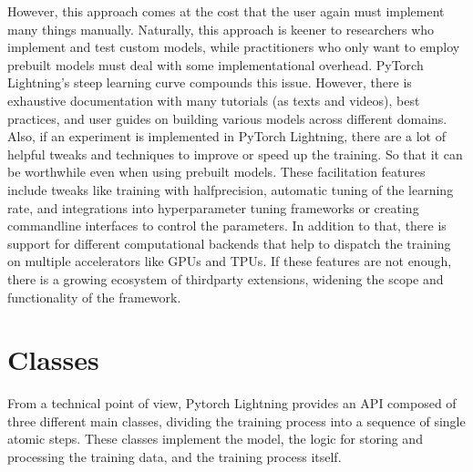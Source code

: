\documentclass[letterpaper,10pt,english]{jupyterBook}
\begin{document}
\sphinxAtStartPar
However, this approach comes at the cost that the user again must implement many things manually.
Naturally, this approach is keener to researchers who implement and test custom models, while practitioners who only want to employ pre\sphinxhyphen{}built models must deal with some implementational overhead.
PyTorch Lightning’s steep learning curve compounds this issue.
However, there is exhaustive documentation with many tutorials (as texts and videos), best practices, and user guides on building various models across different domains.
Also, if an experiment is implemented in PyTorch Lightning, there are a lot of helpful tweaks and techniques to improve or speed up the training.
So that it can be worthwhile even when using pre\sphinxhyphen{}built models.
These facilitation features include tweaks like training with half\sphinxhyphen{}precision, automatic tuning of the learning rate, and integrations into hyperparameter tuning frameworks or creating command\sphinxhyphen{}line interfaces to control the parameters.
In addition to that, there is support for different computational backends that help to dispatch the training on multiple accelerators like GPUs and TPUs.
If these features are not enough, there is a growing ecosystem of third\sphinxhyphen{}party extensions, widening the scope and functionality of the framework.


\section{Classes}
\label{\detokenize{PyTorchLightning:classes}}
\sphinxAtStartPar
From a technical point of view, Pytorch Lightning provides an API composed of three different main classes, dividing the training process into a sequence of single atomic steps.
These classes implement the model, the logic for storing and processing the training data, and the training process itself.
\end{document}
